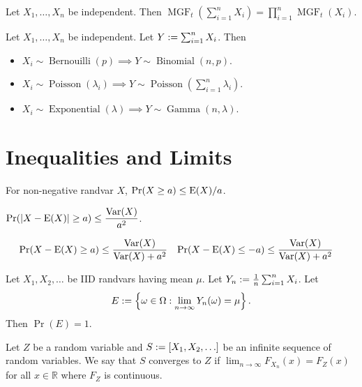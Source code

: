 \documentclass[a4paper, 12pt, fleqn]{article}
\DeclareMathOperator{\MGF}{MGF}
\begin{document}
\begin{theorem}
Let $X_1, \ldots, X_n$ be independent. Then
$\MGF_t\left(\sum_{i=1}^n X_i\right) = \prod_{i=1}^n \MGF_t(X_i)$.
\end{theorem}

\begin{theorem}
Let $X_1, \ldots, X_n$ be independent. Let $Y := \sum_{i=1}^n X_i$. Then
\begin{itemize}
\item $X_i \sim \operatorname{Bernouilli}(p)
    \implies Y \sim \operatorname{Binomial}(n, p)$.
\item $X_i \sim \operatorname{Poisson}(\lambda_i) \implies
    Y \sim \operatorname{Poisson}\left(\sum_{i=1}^n \lambda_i\right)$.
\item $X_i \sim \operatorname{Exponential}(\lambda) \implies
    Y \sim \operatorname{Gamma}(n, \lambda)$.
\end{itemize}
\end{theorem}

\section{Inequalities and Limits}

\begin{theorem}[Markov]
For non-negative randvar $X$, $\Pr(X \ge a) \le \operatorname*{E}(X)/a$.
\end{theorem}

\begin{theorem}[Chebyshev]
$\displaystyle \Pr(|X-\operatorname*{E}(X)| \ge a) \le \frac{\operatorname*{Var}(X)}{a^2}$.
\end{theorem}

\begin{theorem}
\begin{align*}
\Pr(X-\operatorname*{E}(X) \ge a) &\le \frac{\operatorname*{Var}(X)}{\operatorname*{Var}(X)+a^2}
& \Pr(X-\operatorname*{E}(X) \le -a) &\le \frac{\operatorname*{Var}(X)}{\operatorname*{Var}(X)+a^2}
\end{align*}
\end{theorem}

\begin{theorem}
Let $X_1, X_2, \ldots$ be IID randvars having mean $\mu$.
Let $Y_n := \frac{1}{n} \sum_{i=1}^n X_i$. Let
\[ E := \left\{\omega \in \Omega: \lim_{n \to \infty} Y_n(\omega) = \mu\right\}. \]
Then $\Pr(E) = 1$.
\end{theorem}

\begin{definition}
Let $Z$ be a random variable and $S := [X_1, X_2, \ldots]$ be an infinite sequence
of random variables. We say that $S$ converges to $Z$ if
$\lim_{n \to \infty} F_{X_n}(x) = F_Z(x)$ for all $x \in \mathbb{R}$ where $F_Z$ is continuous.
\end{definition}
\end{document}
